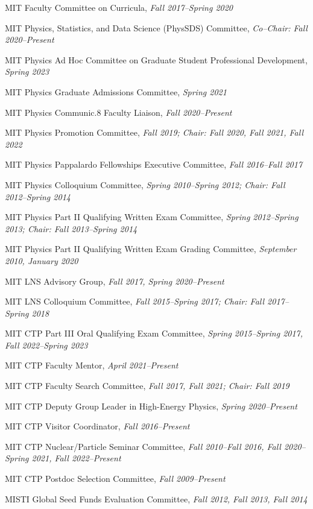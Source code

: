 \bbl
\item MIT Faculty Committee on Curricula, \emph{Fall 2017--Spring 2020}
\item MIT Physics, Statistics, and Data Science (PhysSDS) Committee, \emph{Co--Chair: Fall 2020--Present}
\item MIT Physics Ad Hoc Committee on Graduate Student Professional Development, \emph{Spring 2023}
\item MIT Physics Graduate Admissions Committee, \emph{Spring 2021}
\item MIT Physics Communic.8 Faculty Liaison, \emph{Fall 2020--Present}
\item MIT Physics Promotion Committee, \emph{Fall 2019; Chair: Fall 2020, Fall 2021, Fall 2022}
\item MIT Physics Pappalardo Fellowships Executive Committee, \emph{Fall 2016--Fall 2017}
\item MIT Physics Colloquium Committee, \emph{Spring 2010--Spring 2012; Chair: Fall 2012--Spring 2014}
\item MIT Physics Part II Qualifying Written Exam Committee, \emph{Spring 2012--Spring 2013; Chair: Fall 2013--Spring 2014}
\item MIT Physics Part II Qualifying Written Exam Grading Committee, \emph{September 2010, January 2020}
\item MIT LNS Advisory Group, \emph{Fall 2017, Spring 2020--Present}
\item MIT LNS Colloquium Committee, \emph{Fall 2015--Spring 2017; Chair: Fall 2017--Spring 2018}
\item MIT CTP Part III Oral Qualifying Exam Committee, \emph{Spring 2015--Spring 2017, Fall 2022--Spring 2023}
\item MIT CTP Faculty Mentor, \emph{April 2021--Present}
\item MIT CTP Faculty Search Committee, \emph{Fall 2017, Fall 2021; Chair: Fall 2019}
\item MIT CTP Deputy Group Leader in High-Energy Physics, \emph{Spring 2020--Present}
\item MIT CTP Visitor Coordinator, \emph{Fall 2016--Present}
\item MIT CTP Nuclear/Particle Seminar Committee, \emph{Fall 2010--Fall 2016, Fall 2020--Spring 2021, Fall 2022--Present}
\item MIT CTP Postdoc Selection Committee, \emph{Fall 2009--Present}
\item MISTI Global Seed Funds Evaluation Committee, \emph{Fall 2012, Fall 2013, Fall 2014}
\el
